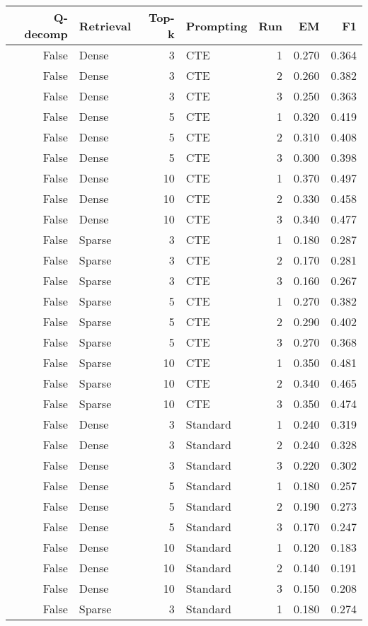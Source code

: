\begin{tabular}{rlrlrrr}
\toprule
Q-decomp & Retrieval & Top-k & Prompting & Run & EM & F1 \\
\midrule
False & Dense & 3 & CTE & 1 & 0.270 & 0.364 \\
False & Dense & 3 & CTE & 2 & 0.260 & 0.382 \\
False & Dense & 3 & CTE & 3 & 0.250 & 0.363 \\
False & Dense & 5 & CTE & 1 & 0.320 & 0.419 \\
False & Dense & 5 & CTE & 2 & 0.310 & 0.408 \\
False & Dense & 5 & CTE & 3 & 0.300 & 0.398 \\
False & Dense & 10 & CTE & 1 & 0.370 & 0.497 \\
False & Dense & 10 & CTE & 2 & 0.330 & 0.458 \\
False & Dense & 10 & CTE & 3 & 0.340 & 0.477 \\
False & Sparse & 3 & CTE & 1 & 0.180 & 0.287 \\
False & Sparse & 3 & CTE & 2 & 0.170 & 0.281 \\
False & Sparse & 3 & CTE & 3 & 0.160 & 0.267 \\
False & Sparse & 5 & CTE & 1 & 0.270 & 0.382 \\
False & Sparse & 5 & CTE & 2 & 0.290 & 0.402 \\
False & Sparse & 5 & CTE & 3 & 0.270 & 0.368 \\
False & Sparse & 10 & CTE & 1 & 0.350 & 0.481 \\
False & Sparse & 10 & CTE & 2 & 0.340 & 0.465 \\
False & Sparse & 10 & CTE & 3 & 0.350 & 0.474 \\
False & Dense & 3 & Standard & 1 & 0.240 & 0.319 \\
False & Dense & 3 & Standard & 2 & 0.240 & 0.328 \\
False & Dense & 3 & Standard & 3 & 0.220 & 0.302 \\
False & Dense & 5 & Standard & 1 & 0.180 & 0.257 \\
False & Dense & 5 & Standard & 2 & 0.190 & 0.273 \\
False & Dense & 5 & Standard & 3 & 0.170 & 0.247 \\
False & Dense & 10 & Standard & 1 & 0.120 & 0.183 \\
False & Dense & 10 & Standard & 2 & 0.140 & 0.191 \\
False & Dense & 10 & Standard & 3 & 0.150 & 0.208 \\
False & Sparse & 3 & Standard & 1 & 0.180 & 0.274 \\

\end{tabular}
